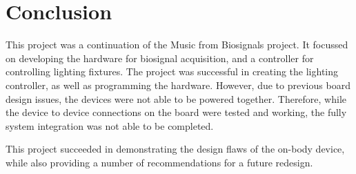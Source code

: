 \chapter{Conclusion}
This project was a continuation of the Music from Biosignals project.
It focussed on developing the hardware for biosignal acquisition, and a controller for controlling lighting fixtures.
The project was successful in creating the lighting controller, as well as programming the hardware.
However, due to previous board design issues, the devices were not able to be powered together.
Therefore, while the device to device connections on the board were tested and working,
the fully system integration was not able to be completed.

This project succeeded in demonstrating the design flaws of the on-body device, while also providing a number of recommendations for a future redesign.
